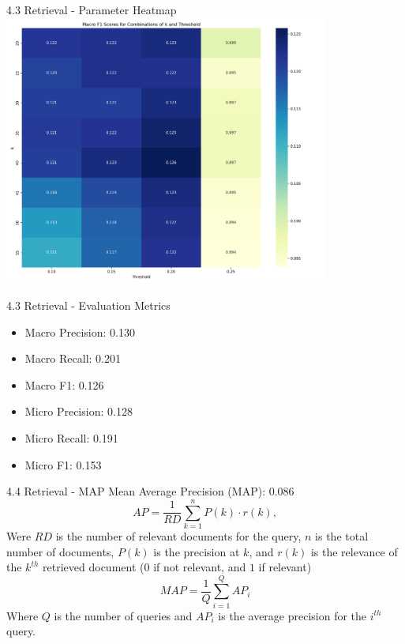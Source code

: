 \documentclass{beamer}
\begin{document}
\begin{frame}{4.3 Retrieval - Parameter Heatmap}
  \centering
  \includegraphics[width=0.8\textwidth]{ir_parameter_heatmap1747239585.png}
\end{frame}

\begin{frame}{4.3 Retrieval - Evaluation Metrics}
  \begin{itemize}
    \item Macro Precision: 0.130
    \item Macro Recall: 0.201
    \item Macro F1: 0.126
    \item Micro Precision: 0.128
    \item Micro Recall: 0.191
    \item Micro F1: 0.153
  \end{itemize}
\end{frame}

\begin{frame}{4.4 Retrieval - MAP}
  Mean Average Precision (MAP): 0.086
  \begin{equation}
    AP = \frac{1}{RD} \sum_{k=1}^{n} P(k) \cdot r(k),
  \end{equation}
  Were $RD$  is the number of relevant documents for the query, $n$ is the total number of documents, $P(k)$
  is the precision at $k$, and $r(k)$ is the relevance of the $k^{th}$ retrieved document ($0$ if not relevant, and $1$ if
  relevant)
  \begin{equation}
    MAP = \frac{1}{Q} \sum_{i=1}^{Q} AP_i
  \end{equation}
  Where $Q$ is the number of queries and $AP_i$ is the average precision for the $i^{th}$ query.
\end{frame}
\end{document}
